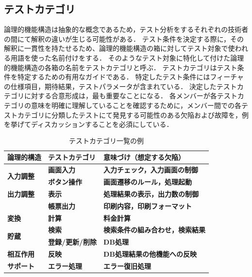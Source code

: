 \subsection{テストカテゴリ}
論理的機能構造は抽象的な概念であるため，テスト分析をするそれぞれの技術者の間にて解釈の違いが生じる可能性がある．
テスト条件を決定する際に，その解釈に一貫性を持たせるため、論理的機能構造の箱に対してテスト対象で使われる用語を使った名前付けをする．
そのようなテスト対象に特化して付けた論理的機能構造の各箱の名前をテストカテゴリと呼ぶ．
テストカテゴリはテスト条件を特定するための有用なガイドである．
特定したテスト条件にはフィーチャの仕様項目，期待結果，テストパラメータが含まれている．
決定したテストカテゴリに対する合意形成は，最も重要なことになる．
各メンバーが各テストカテゴリの意味を明確に理解していることを確認するために，メンバー間での各テストカテゴリに分類したテストにて発見する可能性のある欠陥および故障を，例を挙げてディスカッションすることを必須にしている．

\begin{table}[htbp]
  \centering
  \caption{テストカテゴリ一覧の例}
    \begin{tabular}{|p{6em}|p{8.07em}|p{14.645em}|}
    \hline
    \textbf{論理的構造} & \textbf{テストカテゴリ} & \textbf{意味づけ（想定する欠陥）} \bigstrut\\
    \hline
    \multirow{2}[4]{*}{\textbf{入力調整}} & \textbf{画面入力} & \textbf{入力チェック，入力画面の制御} \bigstrut\\
\cline{2-3}    \multicolumn{1}{|l|}{} & \textbf{ボタン操作} & \textbf{画面遷移のルール，処理起動} \bigstrut\\
    \hline
    \textbf{出力調整} & \textbf{表示} & \textbf{処理結果の表示，出力数の制御} \bigstrut\\
    \hline
    \multicolumn{1}{|r|}{} & \textbf{帳票出力} & \textbf{印刷内容，印刷フォーマット} \bigstrut\\
    \hline
    \textbf{変換} & \textbf{計算} & \textbf{料金計算} \bigstrut\\
    \hline
    \multirow{2}[4]{*}{\textbf{貯蔵}} & \textbf{検索} & \textbf{検索条件の組み合わせ，検索結果} \bigstrut\\
\cline{2-3}    \multicolumn{1}{|l|}{} & \textbf{登録/更新/削除} & \textbf{DB処理} \bigstrut\\
    \hline
    \textbf{相互作用} & \textbf{反映} & \textbf{DB処理結果の他機能への反映} \bigstrut\\
    \hline
    \textbf{サポート} & \textbf{エラー処理} & \textbf{エラー復旧処理} \bigstrut\\
    \hline
    \end{tabular}%
  \label{tbl:D-4-tbl1}%
\end{table}


